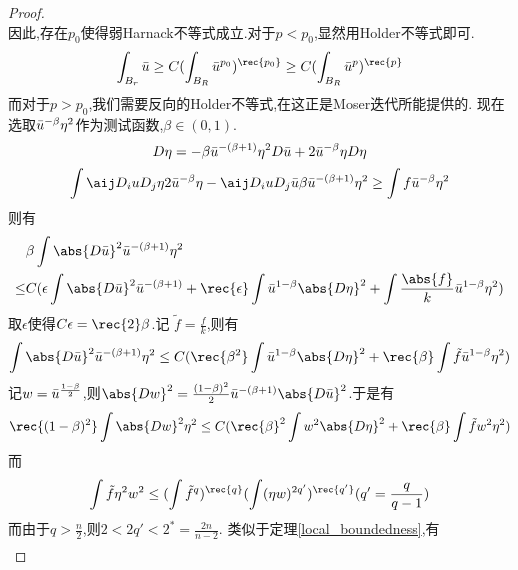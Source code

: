 \begin{proof}
\begin{equation}
    \end{equation}
    因此,存在$p_0$使得弱Harnack不等式成立.对于$p < p_0$,显然用Holder不等式即可.
    \begin{equation}
        \int_{B_r}\ub \ge C(\int_{B_R}\ub^{p_0})^\rec{p_0} \ge C(\int_{B_R}\ub^p)^\rec{p}
    \end{equation}
    而对于$p>p_0$,我们需要反向的Holder不等式,在这正是Moser迭代所能提供的. 现在选取${\bar{u}}^{-\beta}\eta^2$作为测试函数,$\beta \in (0,1)$.
    \begin{equation}
        D\eta = -\beta{\bar{u}}^{-(\beta+1)}\eta^2D{\bar{u}}+2{\bar{u}}^{-\beta}\eta D\eta
    \end{equation}
    \begin{equation}
        \int \aij D_iu D_j\eta 2\ub^{-\beta}\eta - \aij D_iuD_j\ub \beta \ub^{-(\beta+1)}\eta^2 \ge \int f\ub^{-\beta}\eta^2
    \end{equation}
    则有
    \begin{equation}
        \begin{split}
            &\beta \int \abs{D\ub}^2\ub^{-(\beta+1)}\eta^2 \\
            \le & C(\epsilon\int\abs{D\ub}^2\ub^{-(\beta+1)}+\rec{\epsilon}\int\ub^{1-\beta}\abs{D\eta}^2+\int \frac{\abs{f }}{k}\ub^{1-\beta}\eta^2)
        \end{split}
    \end{equation}
    取$\epsilon$使得$C\epsilon=\rec{2}\beta$.记 $\tilde{f}=\frac{f }{k}$,则有
    \begin{equation}
        \int \abs{D\ub}^2\ub^{-(\beta+1)}\eta^2 \le C(\rec{\beta^2}\int \ub^{1-\beta}\abs{D\eta}^2 +\rec{\beta}\int\tilde{f}\ub^{1-\beta}\eta^2)
    \end{equation}
    记$w={\bar{u}}^{\frac{1-\beta }{2}}$,则$\abs{Dw}^2 =\frac{(1-\beta)^2}{2}\ub^{-(\beta+1)}\abs{D\ub}^2$.于是有
    \begin{equation} \label{wsharp}
        \rec{(1-\beta)^2}\int \abs{Dw}^2\eta^2 \le C(\rec{\beta}^2\int w^2 \abs{D\eta}^2 +\rec{\beta}\int \tilde{f}w^2\eta^2)
    \end{equation}
    而
    \begin{equation}
        \int \tilde{f}\eta^2 w^2 \le (\int \tilde{f}^q)^\rec{q} (\int (\eta w)^{2q'})^\rec{q'}(q'=\frac{q}{q-1})
    \end{equation}
    而由于$q> \frac{n}{2}$,则$2< 2q' < 2^* = \frac{2n}{n-2}$. 类似于定理\eqref{local_boundedness},有
    \begin{equation}
        \begin{split}

\end{split}
\end{equation}
\end{proof}
